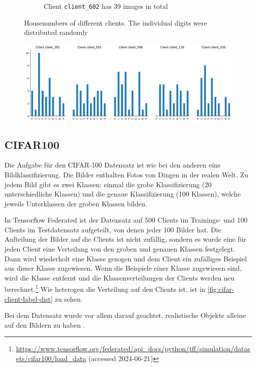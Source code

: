 \begin{figure}[tb]
\begin{subfigure}{0.4\textwidth}
        \caption{Client \texttt{client\_602} has 39 images in total}
    \end{subfigure}
    	\caption{Housenumbers of different clients. The individual digits were distributed randomly}
    \label{fig:svhn-digits}
\end{figure}

\begin{figure}[tb]
	\centering
	\includegraphics[width=\textwidth]{Bilder/svhn_client_label_distribution.png}
	\caption{}
	\label{fig:svhn-client-label-dist}
\end{figure}

\subsection{CIFAR100}

Die Aufgabe für den CIFAR-100 Datensatz ist wie bei den anderen eine Bildklassifizierung. Die Bilder enthalten Fotos von Dingen in der realen Welt. Zu jedem Bild gibt es zwei Klassen: einmal die grobe Klassifizierung (20 unterschiedliche Klassen) und die genaue Klassifizierung (100 Klassen), welche jeweils Unterklassen der groben Klassen bilden.

In Tensorflow Federated ist der Datensatz auf 500 Clients im Trainings- und 100 Clients im Testdatensatz aufgeteilt, von denen jeder 100 Bilder hat. Die Aufteilung der Bilder auf die Clients ist nicht zufällig, sondern es wurde eine für jeden Client eine Verteilung von den groben und genauen Klassen festgelegt. Dann wird wiederholt eine Klasse gezogen und dem Client ein zufälliges Beispiel aus dieser Klasse zugewiesen. Wenn die Beispiele einer Klasse zugewiesen sind, wird die Klasse entfernt und die Klassenverteilungen der Clients werden neu berechnet.\footnote{\url{https://www.tensorflow.org/federated/api_docs/python/tff/simulation/datasets/cifar100/load_data} (accessed 2024-06-21)} Wie heterogen die Verteilung auf den Clients ist, ist in \autoref{fig:cifar-client-label-dist} zu sehen.

Bei dem Datensatz wurde vor allem darauf geachtet, realistische Objekte alleine auf den Bildern zu haben \parencite[p.52f.]{krizhevsky:2009}.

